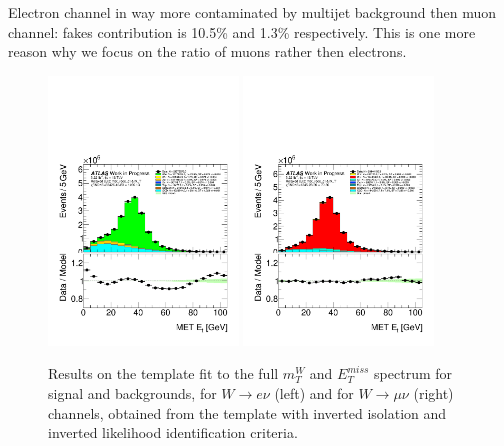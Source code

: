 Electron channel in  way more contaminated by multijet background then muon channel: fakes contribution is 10.5\% and 1.3\% respectively.
This is one more reason why we focus on the ratio of muons rather then electrons.

\begin{figure}[h]
\centering
\includegraphics[width=0.45\textwidth]{figures/SR_MJ/fakeSlices-met_reco_et__M_T-AIso_AID-met_reco_et-antiIsoTight_FakeLepQual-FR1afterFit-el.pdf}
\includegraphics[width=0.45\textwidth]{figures/SR_MJ/fakeSlices-met_reco_et__M_T-AIso_AID-met_reco_et-antiIsoTight_FakeLepQual-FR1afterFit-mu.pdf}
\caption{
Results on the template fit to the full $m_{T}^{W}$ and $E_{T}^{miss}$ spectrum for signal and backgrounds, for $W\rightarrow e\nu$ (left) and for $W\rightarrow \mu\nu$ (right) channels, obtained from the template with inverted isolation and inverted likelihood identification criteria.
}
\label{fig:FR1_ff}
\end{figure}

